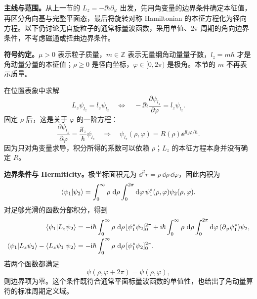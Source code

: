 \textbf{主线与范围。}从上一节的 $L_z=-\ii\hbar\partial_\varphi$ 出发，先用角变量的边界条件确定本征值，再区分角向基与完整平面态，最后将旋转对称 Hamiltonian 的本征方程化为径向方程。以下仍讨论无自旋粒子的通常标量波函数，采用单值、$2\pi$ 周期的角向边界条件，不考虑磁通或扭曲边界条件。

\textbf{符号约定。}$\mu>0$ 表示粒子质量，$m\in\mathbb Z$ 表示无量纲角动量量子数，$l_z=m\hbar$ 才是角动量分量的本征值；$\rho\geq0$ 是径向坐标，$\varphi\in[0,2\pi)$ 是极角。本节的 $m$ 不再表示质量。


在位置表象中求解
\begin{equation}
  L_z\psi_{l_z}=l_z\psi_{l_z}
  \quad\Longleftrightarrow\quad
  -\ii\hbar\frac{\partial\psi_{l_z}}{\partial\varphi}
    =l_z\psi_{l_z}.
\end{equation}
固定 $\rho$ 后，这是关于 $\varphi$ 的一阶方程：
\begin{equation}
  \frac{\partial\psi_{l_z}}{\partial\varphi}
    =\frac{\ii l_z}{\hbar}\psi_{l_z}
  \quad\Longrightarrow\quad
  \psi_{l_z}(\rho,\varphi)=R(\rho)\ee^{\ii l_z\varphi/\hbar}.
  \label{eq:QM-C12-S03-local-eigenfunction}
\end{equation}
因为只对角变量求导，积分所得的系数可以依赖 $\rho$；$L_z$ 的本征方程本身并没有确定 $R$。

\textbf{边界条件与 Hermiticity。}极坐标面积元为 $\dd^2r=\rho\,\dd\rho\,\dd\varphi$，因此内积为
\begin{equation}
  \left\langle \psi_1 \middle| \psi_2 \right\rangle
  =\int_0^\infty\rho\,\mathop{}\!\mathrm{d}\rho\int_0^{2\pi}\mathop{}\!\mathrm{d}\varphi\,
    \psi_1^*(\rho,\varphi)\psi_2(\rho,\varphi).
\end{equation}
对足够光滑的函数分部积分，得到
\begin{align}
  \langle\psi_1|L_z\psi_2\rangle
  &=-\mathrm{i}\hbar\int_0^\infty\rho\,\mathop{}\!\mathrm{d}\rho\,
       [\psi_1^*\psi_2]_0^{2\pi}
    +\mathrm{i}\hbar\int_0^\infty\rho\,\mathop{}\!\mathrm{d}\rho
       \int_0^{2\pi}\mathop{}\!\mathrm{d}\varphi\,(\partial_\varphi\psi_1^*)\psi_2,\notag\\
  \langle\psi_1|L_z\psi_2\rangle-\langle L_z\psi_1|\psi_2\rangle
  &=-\mathrm{i}\hbar\int_0^\infty\rho\,\mathop{}\!\mathrm{d}\rho\,
       [\psi_1^*\psi_2]_0^{2\pi}.
  \label{eq:QM-C12-S03-boundary-form}
\end{align}
若两个函数都满足
\begin{equation}
  \boxed{\psi(\rho,\varphi+2\pi)=\psi(\rho,\varphi)},
  \label{eq:QM-C12-S03-periodicity}
\end{equation}
则边界项为零。这个条件既符合通常平面标量波函数的单值性，也给出了角动量算符的标准周期定义域。

